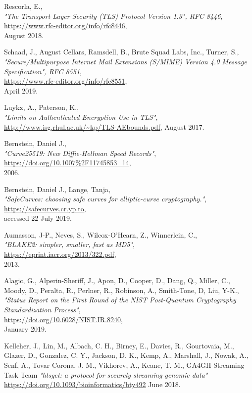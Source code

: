 \documentclass[10pt]{article}
\begin{document}
\begin{thebibliography}{XXXXXXX}
  Rescorla, E.,\\
  \emph{"The Transport Layer Security (TLS) Protocol Version 1.3", RFC 8446},\\
  \url{https://www.rfc-editor.org/info/rfc8446},\\
  August 2018.

  Schaad, J., August Cellars, Ramsdell, B., Brute Squad Labs, Inc., Turner, S.,\\
  \emph{"Secure/Multipurpose Internet Mail Extensions (S/MIME) Version 4.0 Message Specification", RFC 8551},\\
  \url{https://www.rfc-editor.org/info/rfc8551},\\
  April 2019.

  Luykx, A., Paterson, K.,\\
  \emph{"Limits on Authenticated Encryption Use in TLS"},\\
  \url{http://www.isg.rhul.ac.uk/~kp/TLS-AEbounds.pdf},
  August 2017.

  Bernstein, Daniel J.,\\
  \emph{"Curve25519: New Diffie-Hellman Speed Records"},\\
  \url{https://doi.org/10.1007%2F11745853_14},\\
  2006.

  Bernstein, Daniel J., Lange, Tanja,\\
  \emph{"SafeCurves: choosing safe curves for elliptic-curve cryptography."},\\
  \url{https://safecurves.cr.yp.to},\\
  accessed 22 July 2019.

  Aumasson, J-P., Neves, S., Wilcox-O’Hearn, Z., Winnerlein, C.,\\
  \emph{"BLAKE2: simpler, smaller, fast as MD5"},\\
  \url{https://eprint.iacr.org/2013/322.pdf},\\
  2013.

  Alagic, G., Alperin-Sheriff, J., Apon, D., Cooper, D., Dang, Q., Miller, C., Moody, D., Peralta, R., Perlner, R., Robinson, A., Smith-Tone, D, Liu, Y-K.,\\
  \emph{"Status Report on the First Round of the NIST Post-Quantum Cryptography Standardization Process"},\\
  \url{https://doi.org/10.6028/NIST.IR.8240},\\
  January 2019.

  Kelleher, J., Lin, M., Albach, C. H., Birney, E., Davies, R., Gourtovaia, M., Glazer, D., Gonzalez, C. Y., Jackson, D. K., Kemp, A., Marshall, J., Nowak, A., Senf, A., Tovar-Corona, J. M., Vikhorev, A., Keane, T. M., GA4GH Streaming Task Team
  \emph{"htsget: a protocol for securely streaming genomic data"}
  \url{https://doi.org/10.1093/bioinformatics/bty492}
  June 2018.

\end{thebibliography}
\end{document}
